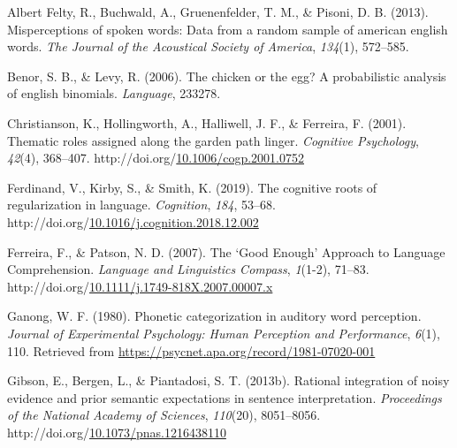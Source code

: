 \documentclass[10pt, letterpaper]{article}
\newenvironment{CSLReferences}%
  {}%
  {\par}
\begin{document}
\hypertarget{refs}{}
\begin{CSLReferences}{1}{0}
\leavevmode{}%
Albert Felty, R., Buchwald, A., Gruenenfelder, T. M., \& Pisoni, D. B.
(2013). Misperceptions of spoken words: Data from a random sample of
american english words. \emph{The Journal of the Acoustical Society of
America}, \emph{134}(1), 572--585.

\leavevmode{}%
Benor, S. B., \& Levy, R. (2006). The chicken or the egg? A
probabilistic analysis of english binomials. \emph{Language}, 233278.

\leavevmode{}%
Christianson, K., Hollingworth, A., Halliwell, J. F., \& Ferreira, F.
(2001). Thematic roles assigned along the garden path linger.
\emph{Cognitive Psychology}, \emph{42}(4), 368--407.
http://doi.org/\href{https://doi.org/10.1006/cogp.2001.0752}{10.1006/cogp.2001.0752}

\leavevmode{}%
Ferdinand, V., Kirby, S., \& Smith, K. (2019). The cognitive roots of
regularization in language. \emph{Cognition}, \emph{184}, 53--68.
http://doi.org/\href{https://doi.org/10.1016/j.cognition.2018.12.002}{10.1016/j.cognition.2018.12.002}

\leavevmode{}%
Ferreira, F., \& Patson, N. D. (2007). The {`}Good Enough{'} Approach to
Language Comprehension. \emph{Language and Linguistics Compass},
\emph{1}(1-2), 71--83.
http://doi.org/\href{https://doi.org/10.1111/j.1749-818X.2007.00007.x}{10.1111/j.1749-818X.2007.00007.x}

\leavevmode{}%
Ganong, W. F. (1980). Phonetic categorization in auditory word
perception. \emph{Journal of Experimental Psychology: Human Perception
and Performance}, \emph{6}(1), 110. Retrieved from
\url{https://psycnet.apa.org/record/1981-07020-001}

\leavevmode{}%
Gibson, E., Bergen, L., \& Piantadosi, S. T. (2013b). Rational
integration of noisy evidence and prior semantic expectations in
sentence interpretation. \emph{Proceedings of the National Academy of
Sciences}, \emph{110}(20), 8051--8056.
http://doi.org/\href{https://doi.org/10.1073/pnas.1216438110}{10.1073/pnas.1216438110}


\end{CSLReferences}
\end{document}
